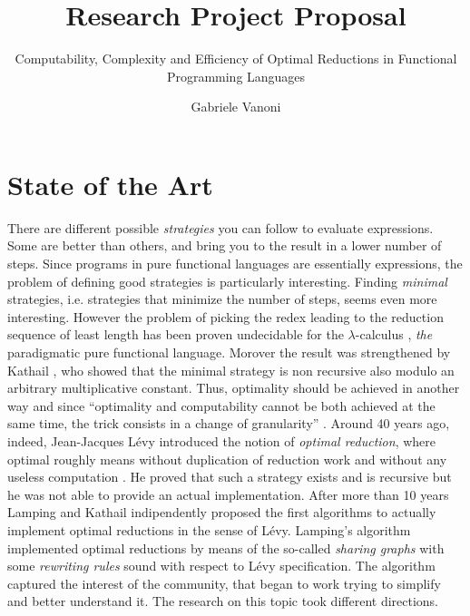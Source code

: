 \documentclass[english]{scrartcl}
\begin{document}
\title{Research Project Proposal}
\subtitle{Computability, Complexity and Efficiency of Optimal Reductions in Functional Programming Languages}
\author{Gabriele Vanoni}
\date{}
\maketitle
\section{State of the Art}
There are different possible \emph{strategies} you can follow to evaluate expressions. Some are better than others, and bring you to the result in a lower number of steps. Since programs in pure functional languages are essentially expressions, the problem of defining good strategies is particularly interesting. Finding \emph{minimal} strategies, i.e. strategies that minimize the number of steps, seems even more interesting. However the problem of picking the redex leading to the reduction sequence of least length has been proven undecidable for the $\lambda$-calculus \cite[Section~13.5]{barendregt_lambda_1984}, \emph{the} paradigmatic pure functional language. Morover the result was strengthened by Kathail \cite[Appendix]{kathail_optimal_1990}, who showed that the minimal strategy is non recursive also modulo an arbitrary multiplicative constant. Thus, optimality should be achieved in another way and since ``optimality and computability cannot be both achieved at the same time, the trick consists in a change of granularity'' \cite{terese_term_2003}. Around 40 years ago, indeed, Jean-Jacques Lévy introduced the notion of \emph{optimal reduction}, where optimal roughly means without duplication of reduction work and without any useless computation \cite{levy_reductions_1978}. He proved that such a strategy exists and is recursive but he was not able to provide an actual implementation. After more than 10 years Lamping \cite{lamping_algorithm_1990} and Kathail \cite{kathail_optimal_1990} indipendently proposed the first algorithms to actually implement optimal reductions in the sense of Lévy. Lamping's algorithm implemented optimal reductions by means of the so-called \emph{sharing graphs} with some \emph{rewriting rules} sound with respect to Lévy specification. The algorithm captured the interest of the community, that began to work trying to simplify and better understand it. The research on this topic took different directions.
\end{document}
